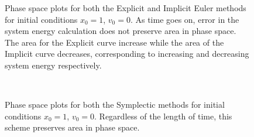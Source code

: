 \documentclass[a4paper, 11pt]{article}
\begin{document}
\begin{figure}[H]
\caption{Phase space plots for both the Explicit and Implicit Euler methods for initial conditions $x_{0}=1$, $v_{0}=0$. As time goes on, error in the system energy calculation does not preserve area in phase space. The area for the Explicit curve increase while the area of the Implicit curve decreases, corresponding to increasing and decreasing system energy respectively.}
\end{figure}


 \begin{figure}[H]
\\ 
\caption{Phase space plots for both the Symplectic methods for initial conditions $x_{0}=1$, $v_{0}=0$. Regardless of the length of time, this scheme preserves area in phase space.}
\end{figure}
\end{document}
